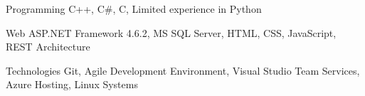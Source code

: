 


\begin{cvskills}


\cvskill
{Programming} %
{C++, C\#, C, Limited experience in Python} %

\cvskill
{Web} %
{ASP.NET Framework 4.6.2, MS SQL Server, HTML, CSS, JavaScript, REST Architecture} %

\cvskill
{Technologies}
{Git, Agile Development Environment, Visual Studio Team Services, Azure Hosting, Linux Systems}






\end{cvskills}